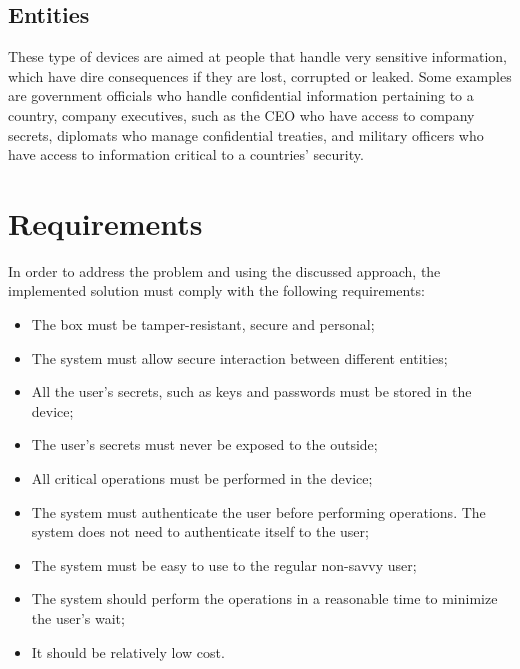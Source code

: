 \cleardoublepage
\label{chap:requirements}


\subsection{Entities} \label{chap:intro:problem:entities}

These type of devices are aimed at people that handle very sensitive information, which have dire consequences if they are lost, corrupted or leaked.
Some examples are government officials who handle confidential information pertaining to a country, company executives, such as the CEO who have access to company secrets, diplomats who manage confidential treaties, and military officers who have access to information critical to a countries' security.


\section{Requirements} \label{chap:requirements}

In order to address the problem and using the discussed approach, the implemented solution must comply with the following requirements:
\begin{itemize}
	\item The box must be tamper-resistant, secure and personal;
	\item The system must allow secure interaction between different entities;
	\item All the user's secrets, such as keys and passwords must be stored in the device;
	\item The user's secrets must never be exposed to the outside;
	\item All critical operations must be performed in the device;
	\item The system must authenticate the user before performing operations. The system does not need to authenticate itself to the user;
	\item The system must be easy to use to the regular non-savvy user;
	\item The system should perform the operations in a reasonable time to minimize the user's wait;
	\item It should be relatively low cost.
\end{itemize}

